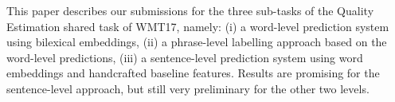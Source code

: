 This paper describes our submissions for the three sub-tasks of the Quality Estimation shared task of WMT17, namely: (i) a word-level prediction system using bilexical embeddings, (ii) a phrase-level labelling approach based on the word-level predictions, (iii) a sentence-level prediction system using word embeddings and handcrafted baseline features. Results are promising for the sentence-level approach, but still very preliminary for the other two levels.
